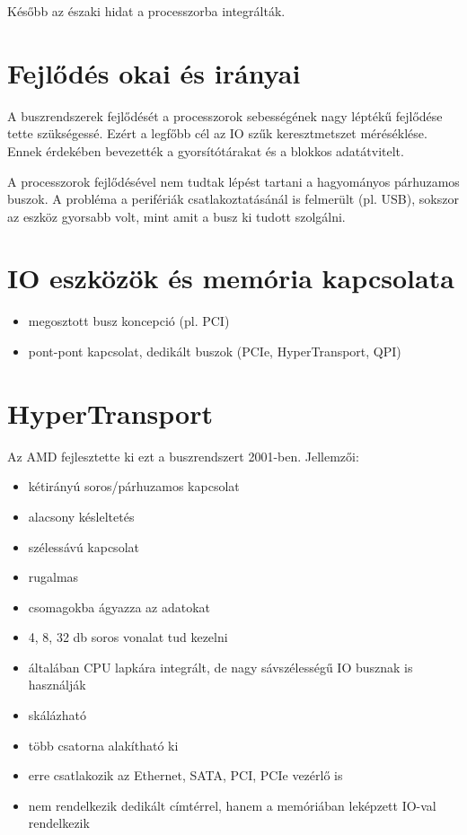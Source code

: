 Később az északi hidat a processzorba integrálták.

\section{Fejlődés okai és irányai}
A buszrendszerek fejlődését a processzorok sebességének nagy léptékű fejlődése tette szükségessé.
Ezért a legfőbb cél az IO szűk keresztmetszet méréséklése.
Ennek érdekében bevezették a gyorsítótárakat és a blokkos adatátvitelt.

A processzorok fejlődésével nem tudtak lépést tartani a hagyományos párhuzamos buszok.
A probléma a perifériák csatlakoztatásánál is felmerült (pl. USB), sokszor az eszköz gyorsabb volt, mint amit a busz ki tudott szolgálni.

\section{IO eszközök és memória kapcsolata}
\begin{itemize}
    \item megosztott busz koncepció (pl. PCI)
    \item pont-pont kapcsolat, dedikált buszok (PCIe, HyperTransport, QPI)
\end{itemize}

\section{HyperTransport}
Az AMD fejlesztette ki ezt a buszrendszert 2001-ben.
Jellemzői:
\begin{itemize}
    \item kétirányú soros/párhuzamos kapcsolat
    \item alacsony késleltetés
    \item szélessávú kapcsolat
    \item rugalmas
    \item csomagokba ágyazza az adatokat
    \item 4, 8, 32 db soros vonalat tud kezelni
    \item általában CPU lapkára integrált, de nagy sávszélességű IO busznak is használják
    \item skálázható
    \item több csatorna alakítható ki
    \item erre csatlakozik az Ethernet, SATA, PCI, PCIe vezérlő is
    \item nem rendelkezik dedikált címtérrel, hanem a memóriában leképzett IO-val rendelkezik
\end{itemize}

